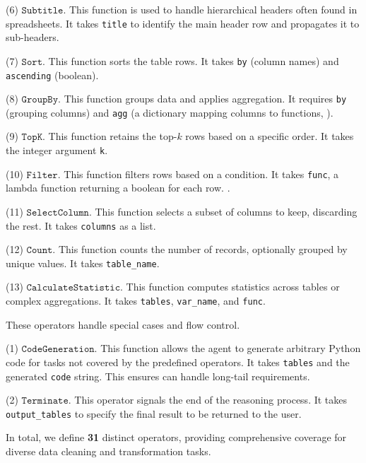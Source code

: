 (6) $\mathtt{Subtitle}$.
    This function is used to handle hierarchical headers often found in spreadsheets. It takes {\small\texttt{title}} to identify the main header row and propagates it to sub-headers.

(7) $\mathtt{Sort}$.
    This function sorts the table rows. It takes {\small\texttt{by}} (column names) and {\small\texttt{ascending}} (boolean).

(8) $\mathtt{GroupBy}$.
    This function groups data and applies aggregation. It requires {\small\texttt{by}} (grouping columns) and {\small\texttt{agg}} (a dictionary mapping columns to functions, ).

(9) $\mathtt{TopK}$.
    This function retains the top-$k$ rows based on a specific order. It takes the integer argument {\small\texttt{k}}.

(10) $\mathtt{Filter}$.
    This function filters rows based on a condition. It takes {\small\texttt{func}}, a lambda function returning a boolean for each row. .

(11) $\mathtt{SelectColumn}$.
    This function selects a subset of columns to keep, discarding the rest. It takes {\small\texttt{columns}} as a list.

(12) $\mathtt{Count}$.
    This function counts the number of records, optionally grouped by unique values. It takes {\small\texttt{table\_name}}.

(13) $\mathtt{CalculateStatistic}$.
    This function computes statistics across tables or complex aggregations. It takes {\small\texttt{tables}}, {\small\texttt{var\_name}}, and {\small\texttt{func}}.

These operators handle special cases and flow control.

(1) $\mathtt{CodeGeneration}$.
    This function allows the agent to generate arbitrary Python code for tasks not covered by the predefined operators. It takes {\small\texttt{tables}} and the generated {\small\texttt{code}} string. This ensures \sys can handle long-tail requirements.

(2) $\mathtt{Terminate}$.
    This operator signals the end of the reasoning process. It takes {\small\texttt{output\_tables}} to specify the final result to be returned to the user.

In total, we define \textbf{31} distinct operators, providing comprehensive coverage for diverse data cleaning and transformation tasks.